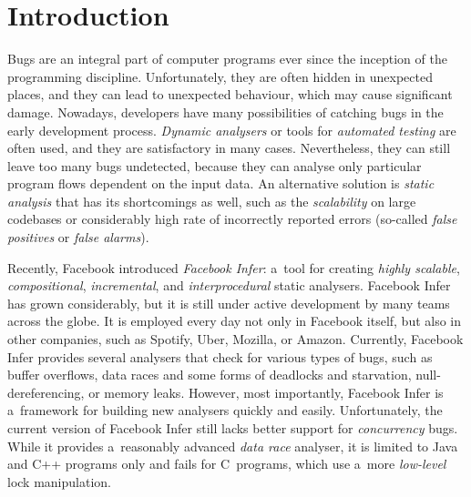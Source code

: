

\section{Introduction}

Bugs are an integral part of computer programs ever since the inception of the
programming discipline. Unfortunately, they are often hidden in unexpected
places, and they can lead to unexpected behaviour, which may cause significant
damage. Nowadays, developers have many possibilities of catching bugs in the
early development process. \emph{Dynamic analysers} or tools for \emph{automated
testing} are often used, and they are satisfactory in many cases. Nevertheless,
they can still leave too many bugs undetected, because they can analyse
only particular program flows dependent on the input data. An alternative
solution is \emph{static analysis} that has its shortcomings as well, such
as the \emph{scalability} on large codebases or considerably high rate of
incorrectly reported errors (so-called \emph{false positives} or \emph{false
alarms}).

Recently, Facebook introduced \emph{Facebook Infer}: a~tool for
creating \emph{highly scalable}, \emph{compositional}, \emph{incremental},
and \emph{interprocedural} static analysers. Facebook Infer has grown
considerably, but it is still under active development by many teams across
the globe. It is employed every day not only in Facebook itself, but also
in other companies, such as Spotify, Uber, Mozilla, or Amazon. Currently,
Facebook Infer provides several analysers that check for various types
of bugs, such as buffer overflows, data races and some forms of deadlocks
and starvation, null-dereferencing, or memory leaks. However, most importantly,
Facebook Infer is a~framework for building new analysers quickly and easily.
Unfortunately, the current version of Facebook Infer still lacks better
support for \emph{concurrency} bugs. While it provides a~reasonably advanced
\emph{data race} analyser, it is limited to Java and C++ programs only and
fails for C~programs, which use a~more \emph{low-level} lock manipulation.

